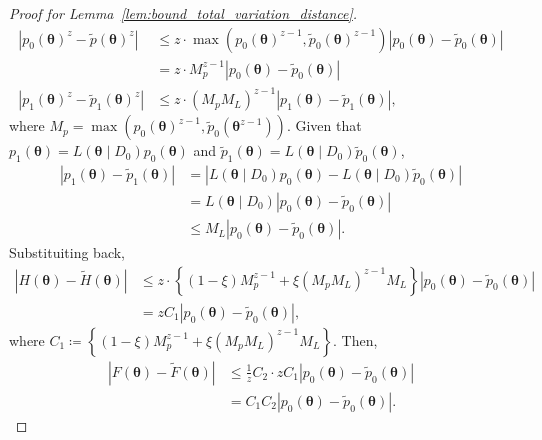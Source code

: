 \documentclass[10pt,a4paper]{amsart}
\begin{document}
\begin{proof}[Proof for Lemma~\ref{lem:bound_total_variation_distance}]
\begin{align*}
        \left|p_0(\bm{\theta})^z - \tilde{p}(\bm{\theta})^z \right| &\leq z\cdot\max\left(p_0(\bm{\theta})^{z - 1}, \tilde{p}_0(\bm{\theta})^{z - 1}\right)|p_0(\bm{\theta}) - \tilde{p}_0(\bm{\theta})| \\
        &= z \cdot M_p^{z - 1} |p_0(\bm{\theta}) - \tilde{p}_0(\bm{\theta})| \\
        \left| p_1(\bm{\theta})^z - \tilde{p}_1(\bm{\theta})^z \right| &\leq z \cdot (M_p M_L)^{z - 1} \left|p_1(\bm{\theta}) - \tilde{p}_1(\bm{\theta})\right|,
    \end{align*}
    where $M_p = \max(p_0(\bm{\theta})^{z - 1}, \tilde{p}_0(\bm{\theta}^{z - 1}))$.
    Given that $p_1(\bm{\theta}) = L(\bm{\theta} \mid D_0)p_0(\bm{\theta})$ and $\tilde{p}_1(\bm{\theta}) = L(\bm{\theta} \mid D_0)\tilde{p}_0(\bm{\theta})$,
    \begin{align*}
        \left|p_1(\bm{\theta}) - \tilde{p}_1(\bm{\theta})\right| &= \left|L(\bm{\theta} \mid D_0)p_0(\bm{\theta}) - L(\bm{\theta} \mid D_0)\tilde{p}_0(\bm{\theta})\right| \\
        &= L(\bm{\theta} \mid D_0) \left|p_0(\bm{\theta}) - \tilde{p}_0(\bm{\theta})\right| \\
        &\leq M_L \left|p_0(\bm{\theta}) - \tilde{p}_0(\bm{\theta})\right|.
    \end{align*}
    Substituiting back,
    \begin{align*}
        \left| H(\bm{\theta}) - \tilde{H}(\bm{\theta}) \right| &\leq z \cdot \left\{(1 - \xi)M_p^{z - 1} + \xi (M_p M_L)^{z - 1} M_L \right\} |p_0(\bm{\theta}) - \tilde{p}_0(\bm{\theta})| \\
        &= z C_1 |p_0(\bm{\theta}) - \tilde{p}_0(\bm{\theta})|,
    \end{align*}
    where $C_1 \coloneqq \left\{(1 - \xi)M_p^{z - 1} + \xi (M_p M_L)^{z - 1} M_L \right\}$.
    Then,
    \begin{align}
        \left|F(\bm{\theta}) - \tilde{F}(\bm{\theta})\right| &\leq \frac{1}{z}C_2 \cdot z C_1 |p_0(\bm{\theta}) - \tilde{p}_0(\bm{\theta})| \nonumber \\
        &= C_1 C_2 |p_0(\bm{\theta}) - \tilde{p}_0(\bm{\theta})|. \label{eq:bound_for_f_f_tilde}
    \end{align}


\end{proof}
\end{document}
